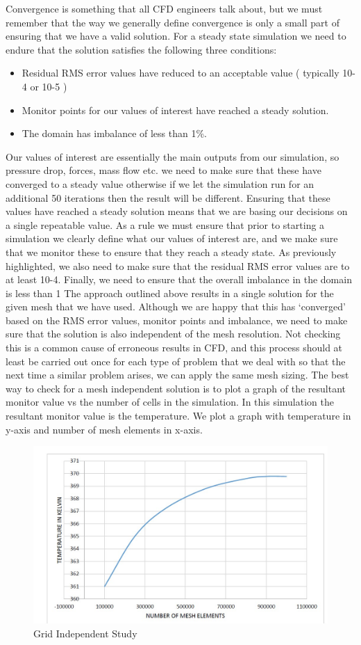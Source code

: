 Convergence is something that all CFD engineers talk about, but we must remember that the way we generally define convergence is only a small part of ensuring that we have a valid solution. For a steady state simulation we need to endure that the solution satisfies the following three conditions:
\begin{itemize}
	\item 	Residual RMS error values have reduced to an acceptable value ( typically 10-4 or 10-5 )
	\item Monitor points for our values of interest have reached a steady solution.
\item The domain has imbalance of less than 1\%.
\end{itemize}
Our values of interest are essentially the main outputs from our simulation, so pressure drop, forces, mass flow etc. we need to make sure that these have converged to a steady value otherwise if we let the simulation run for an additional 50 iterations then the result will be different. Ensuring that these values have reached a steady solution means that we are basing our decisions on a single repeatable value.
As a rule we must ensure that prior to starting a simulation we clearly define what our values of interest are, and we make sure that we monitor these to ensure that they reach a steady state. As previously highlighted, we also need to make sure that the residual RMS error values are to at least 10-4. Finally, we need to ensure that the overall imbalance in the domain is less than 1%
The approach outlined above results in a single solution for the given mesh that we have used. Although we are happy that this has ‘converged’ based on the RMS error values, monitor points and imbalance, we need to make sure that the solution is also independent of the mesh resolution. Not checking this is a common cause of erroneous results in CFD, and this process should at least be carried out once for each type of problem that we deal with so that the next time a similar problem arises, we can apply the same mesh sizing.
The best way to check for a mesh independent solution is to plot a graph of the resultant monitor value vs the number of cells in the simulation. In this simulation the resultant monitor value is the temperature. We plot a graph with temperature in y-axis and number of mesh elements in x-axis.


\begin{figure}[h]
	\label{ss}    %
	\centering
	\includegraphics[width= 10 cm]{103.jpg}
	\caption{ Grid Independent Study}
\end{figure}

